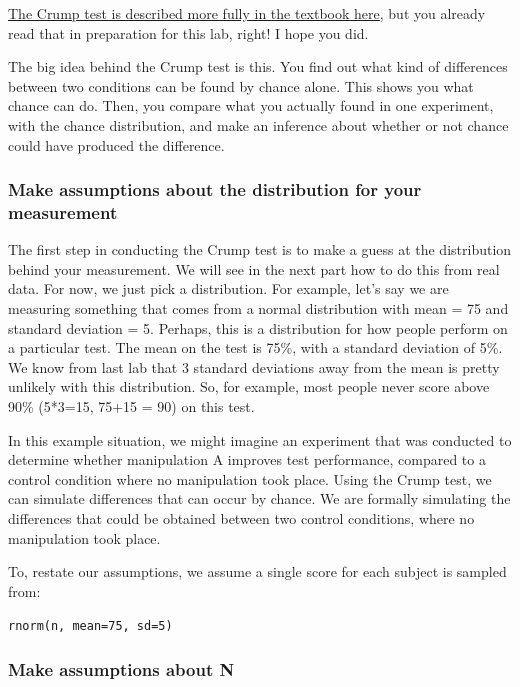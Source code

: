 \documentclass[]{book}
\theoremstyle{definition}
\theoremstyle{definition}
\theoremstyle{definition}
\theoremstyle{remark}
\begin{document}
\href{https://crumplab.github.io/statistics/foundations-for-inference.html\#the-crump-test}{The
Crump test is described more fully in the textbook here}, but you
already read that in preparation for this lab, right! I hope you did.

The big idea behind the Crump test is this. You find out what kind of
differences between two conditions can be found by chance alone. This
shows you what chance can do. Then, you compare what you actually found
in one experiment, with the chance distribution, and make an inference
about whether or not chance could have produced the difference.

\subsubsection{Make assumptions about the distribution for your
measurement}\label{make-assumptions-about-the-distribution-for-your-measurement}

The first step in conducting the Crump test is to make a guess at the
distribution behind your measurement. We will see in the next part how
to do this from real data. For now, we just pick a distribution. For
example, let's say we are measuring something that comes from a normal
distribution with mean = 75 and standard deviation = 5. Perhaps, this is
a distribution for how people perform on a particular test. The mean on
the test is 75\%, with a standard deviation of 5\%. We know from last
lab that 3 standard deviations away from the mean is pretty unlikely
with this distribution. So, for example, most people never score above
90\% (5*3=15, 75+15 = 90) on this test.

In this example situation, we might imagine an experiment that was
conducted to determine whether manipulation A improves test performance,
compared to a control condition where no manipulation took place. Using
the Crump test, we can simulate differences that can occur by chance. We
are formally simulating the differences that could be obtained between
two control conditions, where no manipulation took place.

To, restate our assumptions, we assume a single score for each subject
is sampled from:

\texttt{rnorm(n,\ mean=75,\ sd=5)}

\subsubsection{Make assumptions about N}\label{make-assumptions-about-n}
\end{document}
